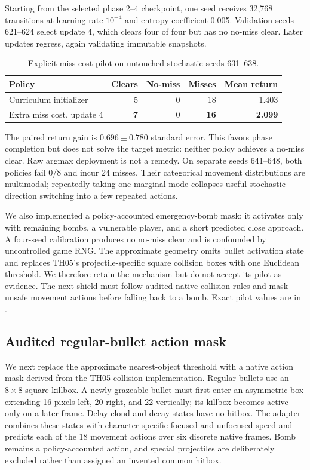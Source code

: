 \documentclass[10pt]{article}
\begin{document}
Starting from the selected phase 2--4 checkpoint, one seed receives 32,768
transitions at learning rate $10^{-4}$ and entropy coefficient 0.005.
Validation seeds 621--624 select update 4, which clears four of four but has no
no-miss clear.  Later updates regress, again validating immutable snapshots.

\begin{table}[ht]
  \centering
  \caption{Explicit miss-cost pilot on untouched stochastic seeds 631--638.}
  \label{tab:miss-cost}
  \begin{tabular}{lrrrr}
    \toprule
    Policy & Clears & No-miss & Misses & Mean return \\
    \midrule
    Curriculum initializer & 5 & 0 & 18 & 1.403 \\
    Extra miss cost, update 4 & \textbf{7} & 0 & \textbf{16} & \textbf{2.099} \\
    \bottomrule
  \end{tabular}
\end{table}

The paired return gain is $0.696\pm0.780$ standard error.  This favors phase
completion but does not solve the target metric: neither policy achieves a
no-miss clear.  Raw argmax deployment is not a remedy.  On separate seeds
641--648, both policies fail 0/8 and incur 24 misses.  Their categorical
movement distributions are multimodal; repeatedly taking one marginal mode
collapses useful stochastic direction switching into a few repeated actions.

We also implemented a policy-accounted emergency-bomb mask: it activates only
with remaining bombs, a vulnerable player, and a short predicted close
approach.  A four-seed calibration produces no no-miss clear and is confounded
by uncontrolled game RNG.  The approximate geometry omits bullet activation
state and replaces TH05's projectile-specific square collision boxes with one
Euclidean threshold.  We therefore retain the mechanism but do not accept its
pilot as evidence.  The next shield must follow audited native collision rules
and mask unsafe movement actions before falling back to a bomb.  Exact pilot
values are in
.

\subsection{Audited regular-bullet action mask}

We next replace the approximate nearest-object threshold with a native action
mask derived from the TH05 collision implementation.  Regular bullets use an
$8\times8$ square killbox.  A newly grazeable bullet must first enter an
asymmetric box extending 16 pixels left, 20 right, and 22 vertically; its
killbox becomes active only on a later frame.  Delay-cloud and decay states have
no hitbox.  The adapter combines these states with character-specific focused
and unfocused speed and predicts each of the 18 movement actions over six
discrete native frames.  Bomb remains a policy-accounted action, and special
projectiles are deliberately excluded rather than assigned an invented common
hitbox.
\end{document}

